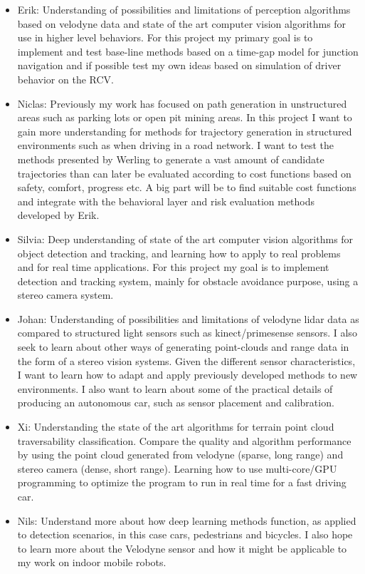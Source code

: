 \documentclass[11pt,a4paper]{article}
\begin{document}
\begin{itemize}
\item 
Erik: Understanding of possibilities and limitations of perception
algorithms based on velodyne data and state of the art computer
vision algorithms for use in higher level behaviors. For this
project my primary goal is to implement and test base-line methods
based on a time-gap model for junction navigation and if possible
test my own ideas based on simulation of driver behavior on the RCV.

\item 
Niclas: Previously my work has focused on path generation in
unstructured areas such as parking lots or open pit mining areas. In
this project I want to gain more understanding for methods for
trajectory generation in structured environments such as when
driving in a road network. I want to test the methods presented by
Werling to generate a vast amount of candidate trajectories than can
later be evaluated according to cost functions based on safety,
comfort, progress etc. A big part will be to find suitable cost
functions and integrate with the behavioral layer and risk
evaluation methods developed by Erik.

\item 
Silvia: Deep understanding of state of the art computer vision algorithms for
object detection and tracking, and learning how to apply to real problems and
for real time applications. For this project my goal is to implement detection
and tracking system, mainly for obstacle avoidance purpose, using a stereo camera system.

\item 
Johan: Understanding of possibilities and limitations of velodyne
lidar data as compared to structured light sensors such as
kinect/primesense sensors. I also seek to learn about other ways of
generating point-clouds and range data in the form of a stereo vision
systems. Given the different sensor characteristics, I want to learn
how to adapt and apply previously developed methods to new
environments. I also want to learn about some of the practical
details of producing an autonomous car, such as sensor placement and
calibration.

\item 
Xi: Understanding the state of the art algorithms for terrain point
cloud traversability classification. Compare the quality and
algorithm performance by using the point cloud generated from
velodyne (sparse, long range) and stereo camera (dense, short
range). Learning how to use multi-core/GPU programming to optimize
the program to run in real time for a fast driving car.

\item 
Nils: Understand more about how deep learning methods function, as applied
to detection scenarios, in this case cars, pedestrians and bicycles.
I also hope to learn more about the Velodyne sensor and how it might
be applicable to my work on indoor mobile robots.

\end{itemize}


\end{document}

